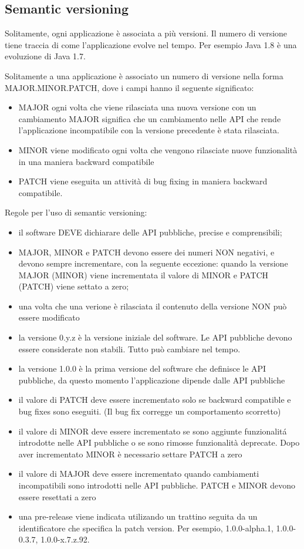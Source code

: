 \documentclass{article}
\theoremstyle{definition}
\begin{document}
\subsection{Semantic versioning}
Solitamente, ogni applicazione \`e associata a pi\`u versioni. Il numero di versione tiene traccia di come l'applicazione evolve nel tempo.
Per esempio Java 1.8 \`e una evoluzione di Java 1.7.

Solitamente a una applicazione \`e associato un numero di versione nella forma MAJOR.MINOR.PATCH, dove i campi hanno il seguente significato:
\begin{itemize}
\item MAJOR ogni volta che viene rilasciata una nuova versione con un cambiamento MAJOR significa che un cambiamento nelle API che rende l'applicazione incompatibile con la versione precedente \`e stata rilasciata. 
\item MINOR viene modificato ogni volta che vengono rilasciate nuove funzionalit\`a in una maniera backward compatibile
\item PATCH viene eseguita un attivit\`a di bug fixing in maniera backward compatibile.
\end{itemize}

Regole per l'uso di semantic versioning:
\begin{itemize}
\item il software DEVE dichiarare delle API pubbliche, precise e comprensibili;
\item MAJOR, MINOR e PATCH devono essere dei numeri NON negativi, e devono sempre incrementare, con la seguente eccezione: quando la versione MAJOR (MINOR) viene incrementata il valore di MINOR e PATCH (PATCH) viene settato a zero;
\item una volta che una verione \`e rilasciata il contenuto della versione NON pu\`o essere modificato
\item la versione 0.y.z \`e la versione iniziale del software. Le API pubbliche devono essere considerate non stabili. Tutto pu\`o cambiare nel tempo.
\item la versione 1.0.0 \`e la prima versione del software che definisce le API pubbliche, da questo momento l'applicazione dipende dalle API pubbliche
\item il valore di PATCH deve essere incrementato solo se backward compatible e bug fixes sono eseguiti. (Il bug fix corregge un comportamento scorretto)
\item il valore di MINOR deve essere incrementato se sono aggiunte funzionalit\'a introdotte nelle API pubbliche o se sono rimosse funzionalit\`a deprecate. Dopo aver incrementato MINOR \`e necessario settare PATCH a zero
\item il valore di MAJOR deve essere incrementato quando cambiamenti incompatibili sono introdotti nelle API pubbliche. PATCH e MINOR devono essere resettati a zero
\item una pre-release viene indicata utilizando un trattino seguita da un identificatore che specifica la patch version. Per esempio, 1.0.0-alpha.1, 1.0.0-0.3.7, 1.0.0-x.7.z.92. 
\end{itemize}
\end{document}
